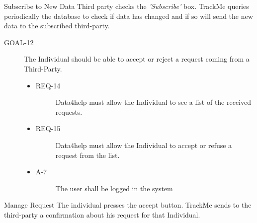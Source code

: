 \documentclass[a4paper]{article}
\newcommand{\requirement}{\ding{229}}%
\begin{document}
        \begin{usecase}{Subscribe to New Data}
            {Third party checks the \textit{'Subscribe'} box.}
            {TrackMe queries periodically the database to check if data has changed and if so will send the new data to the subscribed third-party.}
        \end{usecase}
        
        \begin{description}
        	\item[GOAL-12] The Individual should be able to accept or reject a request coming from a Third-Party. 
            	\begin{itemize}
            	    \item[\requirement]
                	\begin{description}
                	\item[REQ-14] Data4help must allow the Individual to see a list of the received requests. 
                	\end{description}
                	\item[\requirement]
                	\begin{description}
                	\item[REQ-15] Data4help must allow the Individual to accept or refuse a request from the list. 
                	\end{description}
                	\item
                	\begin{description}
                	\item[A-7] The user shall be logged in the system
                	\end{description}
                	\end{itemize}
        \end{description}
        
        \begin{usecase}{Manage Request}
              {The individual presses the accept button.}
              {TrackMe sends to the third-party a confirmation about his request for that Individual.}
        \end{usecase}
        
\end{document}
